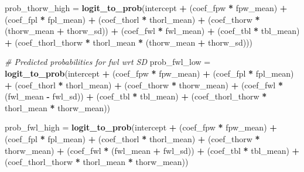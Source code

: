 \documentclass[
]{article}
\newenvironment{Shaded}{\begin{snugshade}}{\end{snugshade}}
\newcommand{\CommentTok}[1]{\textcolor[rgb]{0.56,0.35,0.01}{\textit{#1}}}
\newcommand{\FunctionTok}[1]{\textcolor[rgb]{0.13,0.29,0.53}{\textbf{#1}}}
\newcommand{\NormalTok}[1]{#1}
\newcommand{\OtherTok}[1]{\textcolor[rgb]{0.56,0.35,0.01}{#1}}
\newcommand{\SpecialCharTok}[1]{\textcolor[rgb]{0.81,0.36,0.00}{\textbf{#1}}}
\begin{document}
\begin{Shaded}
\begin{Highlighting}[]
\NormalTok{prob\_thorw\_high }\OtherTok{=} \FunctionTok{logit\_to\_prob}\NormalTok{(intercept }\SpecialCharTok{+} 
\NormalTok{                                 (coef\_fpw }\SpecialCharTok{*}\NormalTok{ fpw\_mean) }\SpecialCharTok{+} 
\NormalTok{                                 (coef\_fpl }\SpecialCharTok{*}\NormalTok{ fpl\_mean) }\SpecialCharTok{+} 
\NormalTok{                                 (coef\_thorl }\SpecialCharTok{*}\NormalTok{ thorl\_mean) }\SpecialCharTok{+} 
\NormalTok{                                 (coef\_thorw }\SpecialCharTok{*}\NormalTok{ (thorw\_mean }\SpecialCharTok{+}\NormalTok{ thorw\_sd)) }\SpecialCharTok{+} 
\NormalTok{                                 (coef\_fwl }\SpecialCharTok{*}\NormalTok{ fwl\_mean) }\SpecialCharTok{+} 
\NormalTok{                                 (coef\_tbl }\SpecialCharTok{*}\NormalTok{ tbl\_mean) }\SpecialCharTok{+} 
\NormalTok{                                 (coef\_thorl\_thorw }\SpecialCharTok{*}\NormalTok{ thorl\_mean }\SpecialCharTok{*}\NormalTok{ (thorw\_mean }\SpecialCharTok{+}\NormalTok{ thorw\_sd)))}

\CommentTok{\# Predicted probabilities for fwl wrt SD}
\NormalTok{prob\_fwl\_low }\OtherTok{=} \FunctionTok{logit\_to\_prob}\NormalTok{(intercept }\SpecialCharTok{+} 
\NormalTok{                               (coef\_fpw }\SpecialCharTok{*}\NormalTok{ fpw\_mean) }\SpecialCharTok{+} 
\NormalTok{                               (coef\_fpl }\SpecialCharTok{*}\NormalTok{ fpl\_mean) }\SpecialCharTok{+} 
\NormalTok{                               (coef\_thorl }\SpecialCharTok{*}\NormalTok{ thorl\_mean) }\SpecialCharTok{+} 
\NormalTok{                               (coef\_thorw }\SpecialCharTok{*}\NormalTok{ thorw\_mean) }\SpecialCharTok{+} 
\NormalTok{                               (coef\_fwl }\SpecialCharTok{*}\NormalTok{ (fwl\_mean }\SpecialCharTok{{-}}\NormalTok{ fwl\_sd)) }\SpecialCharTok{+} 
\NormalTok{                               (coef\_tbl }\SpecialCharTok{*}\NormalTok{ tbl\_mean) }\SpecialCharTok{+} 
\NormalTok{                               (coef\_thorl\_thorw }\SpecialCharTok{*}\NormalTok{ thorl\_mean }\SpecialCharTok{*}\NormalTok{ thorw\_mean))}

\NormalTok{prob\_fwl\_high }\OtherTok{=} \FunctionTok{logit\_to\_prob}\NormalTok{(intercept }\SpecialCharTok{+} 
\NormalTok{                                (coef\_fpw }\SpecialCharTok{*}\NormalTok{ fpw\_mean) }\SpecialCharTok{+} 
\NormalTok{                                (coef\_fpl }\SpecialCharTok{*}\NormalTok{ fpl\_mean) }\SpecialCharTok{+} 
\NormalTok{                                (coef\_thorl }\SpecialCharTok{*}\NormalTok{ thorl\_mean) }\SpecialCharTok{+} 
\NormalTok{                                (coef\_thorw }\SpecialCharTok{*}\NormalTok{ thorw\_mean) }\SpecialCharTok{+} 
\NormalTok{                                (coef\_fwl }\SpecialCharTok{*}\NormalTok{ (fwl\_mean }\SpecialCharTok{+}\NormalTok{ fwl\_sd)) }\SpecialCharTok{+} 
\NormalTok{                                (coef\_tbl }\SpecialCharTok{*}\NormalTok{ tbl\_mean) }\SpecialCharTok{+} 
\NormalTok{                                (coef\_thorl\_thorw }\SpecialCharTok{*}\NormalTok{ thorl\_mean }\SpecialCharTok{*}\NormalTok{ thorw\_mean))}


\end{Highlighting}
\end{Shaded}
\end{document}
